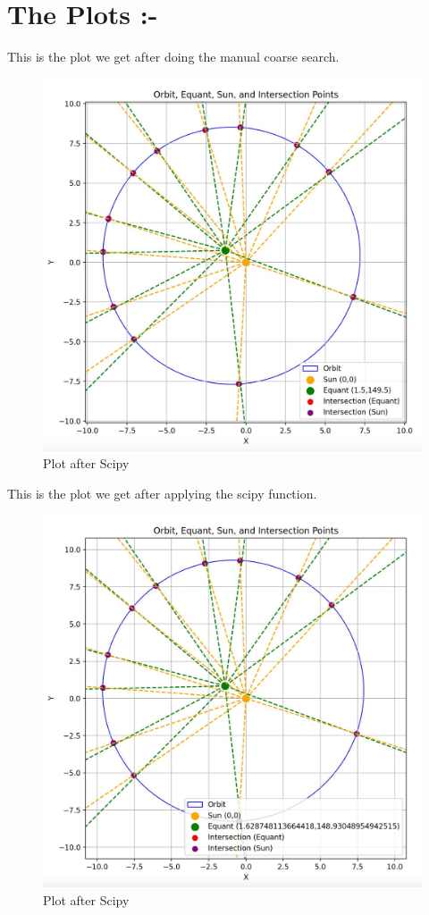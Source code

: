 \documentclass{article}
\begin{document}
\newpage
\section{The Plots :-}

This is the plot we get after doing the manual coarse search.
\begin{figure}[htbp]
    \centering
    \includegraphics[width=\linewidth]{Before_scipy.jpeg}
    \caption{Plot after Scipy}
    \label{fig1:example}
  \end{figure}

\newpage

This is the plot we get after applying the scipy function.
\begin{figure}[htbp]
    \centering
    \includegraphics[width=\linewidth]{After_scipy1.jpeg}
    \caption{Plot after Scipy}
    \label{fig2:example}
  \end{figure}
\end{document}
